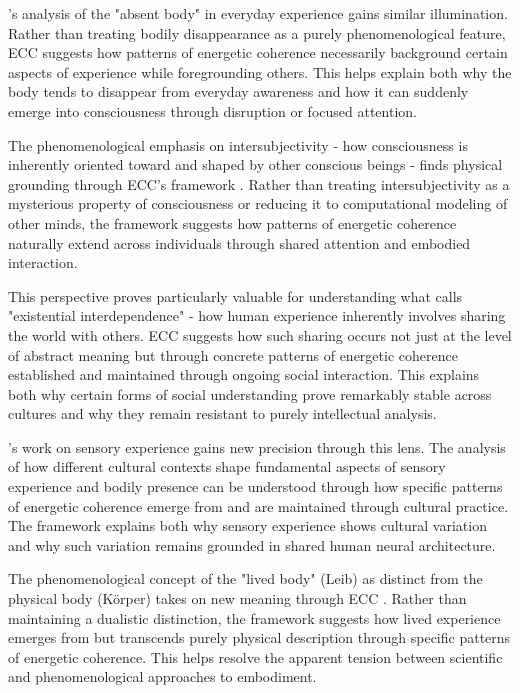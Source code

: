 \begin{refsection}
\cite{leder1990absent}'s analysis of the "absent body" in everyday experience gains similar illumination. Rather than treating bodily disappearance as a purely phenomenological feature, ECC suggests how patterns of energetic coherence necessarily background certain aspects of experience while foregrounding others. This helps explain both why the body tends to disappear from everyday awareness and how it can suddenly emerge into consciousness through disruption or focused attention.

The phenomenological emphasis on intersubjectivity - how consciousness is inherently oriented toward and shaped by other conscious beings - finds physical grounding through ECC's framework \cite{jackson1996things}. Rather than treating intersubjectivity as a mysterious property of consciousness or reducing it to computational modeling of other minds, the framework suggests how patterns of energetic coherence naturally extend across individuals through shared attention and embodied interaction.

This perspective proves particularly valuable for understanding what \cite{jackson1996things} calls "existential interdependence" - how human experience inherently involves sharing the world with others. ECC suggests how such sharing occurs not just at the level of abstract meaning but through concrete patterns of energetic coherence established and maintained through ongoing social interaction. This explains both why certain forms of social understanding prove remarkably stable across cultures and why they remain resistant to purely intellectual analysis.

\cite{desjarlais1992body}'s work on sensory experience gains new precision through this lens. The analysis of how different cultural contexts shape fundamental aspects of sensory experience and bodily presence can be understood through how specific patterns of energetic coherence emerge from and are maintained through cultural practice. The framework explains both why sensory experience shows cultural variation and why such variation remains grounded in shared human neural architecture.

The phenomenological concept of the "lived body" (Leib) as distinct from the physical body (Körper) takes on new meaning through ECC \cite{varela1991embodied}. Rather than maintaining a dualistic distinction, the framework suggests how lived experience emerges from but transcends purely physical description through specific patterns of energetic coherence. This helps resolve the apparent tension between scientific and phenomenological approaches to embodiment.


\end{refsection}
